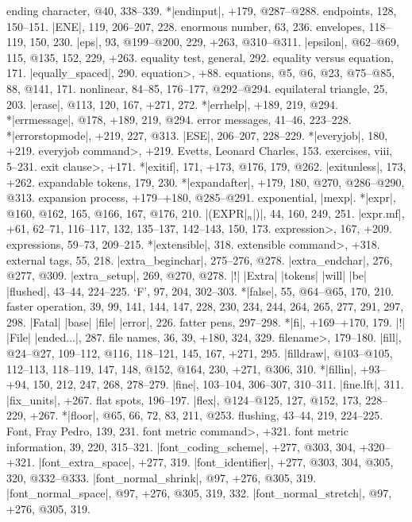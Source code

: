 ending character, @40, 338--339.
*|endinput|, +179, @287--@288.
endpoints, 128, 150--151.
|ENE|, 119, 206--207, 228.
enormous number, 63, 236.
envelopes, 118--119, 150, 230.
|eps|, 93, @199--@200, 229, +263, @310--@311.
|epsilon|, @62--@69, 115, @135, 152, 229, +263.
equality test, general, 292.
equality versus equation, 171.
|equally_spaced|, 290.
\<equation>, +88.
equations, @5, @6, @23, @75--@85, 88, @141, 171.
\sub nonlinear, 84--85, 176--177, @292--@294.
equilateral triangle, 25, 203.
|erase|, @113, 120, 167, +271, 272.
*|errhelp|, +189, 219, @294.
*|errmessage|, @178, +189, 219, @294.
error messages, 41--46, 223--228.
*|errorstopmode|, +219, 227, @313.
|ESE|, 206--207, 228--229.
*|everyjob|, 180, +219.
\<everyjob command>, +219.
Evetts, Leonard Charles, 153.
exercises, viii, 5--231.
\<exit clause>, +171.
*|exitif|, 171, +173, @176, 179, @262.
|exitunless|, 173, +262.
expandable tokens, 179, 230.
*|expandafter|, +179, 180, @270, @286--@290, @313.
expansion process, +179--+180, @285--@291.
exponential, \see |mexp|.
*|expr|, @160, @162, 165, @166, 167, @176, 210.
|(EXPR|$_n$|)|, 44, 160, 249, 251.
|expr.mf|, +61, 62--71, 116--117, 132, 135--137, 142--143, 150, 173.
\<expression>, 167, +209.
expressions, 59--73, 209--215.
*|extensible|, 318.
\<extensible command>, +318.
external tags, 55, 218.
|extra_beginchar|, 275--276, @278.
|extra_endchar|, 276, @277, @309.
|extra_setup|, 269, @270, @278.
|!| |Extra| |tokens| |will| |be| |flushed|, 43--44, 224--225.
\newletter
`F', 97, 204, 302--303.
*|false|, 55, @64--@65, 170, 210.
faster operation, 39, 99, 141, 144, 147, 228, 230, 234, 244, 264, 265, 277,
 291, 297, 298.
|Fatal| |base| |file| |error|, 226.
fatter pens, 297--298.
*|fi|, +169--+170, 179.
|!| |File| |ended...|, 287.
file names, 36, 39, +180, 324, 329.
\<filename>, 179--180.
|fill|, @24--@27, 109--112, @116, 118--121, 145, 167, +271, 295.
|filldraw|, @103--@105, 112--113, 118--119, 147, 148, @152, @164,
 230, +271, @306, 310.
*|fillin|, +93--+94, 150, 212, 247, 268, 278--279.
|fine|, 103--104, 306--307, 310--311.
|fine.lft|, 311.
|fix_units|, +267.
flat spots, 196--197.
|flex|, @124--@125, 127, @152, 173, 228--229, +267.
*|floor|, @65, 66, 72, 83, 211, @253.
flushing, 43--44, 219, 224--225.
Font, Fray Pedro, 139, 231.
\<font metric command>, +321.
font metric information, 39, 220, 315--321.
|font_coding_scheme|, +277, @303, 304, +320--+321.
|font_extra_space|, +277, 319.
|font_identifier|, +277, @303, 304, @305, 320, @332--@333.
|font_normal_shrink|, @97, +276, @305, 319.
|font_normal_space|, @97, +276, @305, 319, 332.
|font_normal_stretch|, @97, +276, @305, 319.
